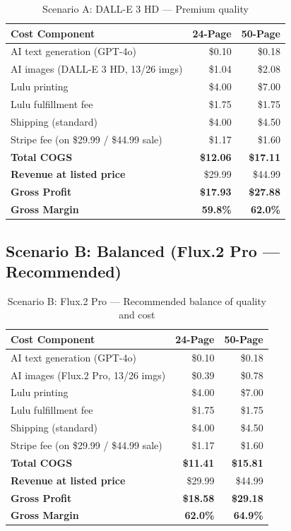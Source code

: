 \documentclass[12pt, letterpaper, oneside]{book}
\begin{document}
\begin{table}[H]
\centering
\begin{tabular}{lrr}
\toprule
\textbf{Cost Component} & \textbf{24-Page} & \textbf{50-Page} \\
\midrule
AI text generation (GPT-4o) & \$0.10 & \$0.18 \\
AI images (DALL-E 3 HD, 13/26 imgs) & \$1.04 & \$2.08 \\
Lulu printing & \$4.00 & \$7.00 \\
Lulu fulfillment fee & \$1.75 & \$1.75 \\
Shipping (standard) & \$4.00 & \$4.50 \\
Stripe fee (on \$29.99 / \$44.99 sale) & \$1.17 & \$1.60 \\
\midrule
\textbf{Total COGS} & \textbf{\$12.06} & \textbf{\$17.11} \\
\textbf{Revenue at listed price} & \$29.99 & \$44.99 \\
\textbf{Gross Profit} & \textcolor{success}{\textbf{\$17.93}} & \textcolor{success}{\textbf{\$27.88}} \\
\textbf{Gross Margin} & \textcolor{success}{\textbf{59.8\%}} & \textcolor{success}{\textbf{62.0\%}} \\
\bottomrule
\end{tabular}
\caption{Scenario A: DALL-E 3 HD --- Premium quality}
\end{table}

\subsection{Scenario B: Balanced (Flux.2 Pro --- Recommended)}

\begin{table}[H]
\centering
\begin{tabular}{lrr}
\toprule
\textbf{Cost Component} & \textbf{24-Page} & \textbf{50-Page} \\
\midrule
AI text generation (GPT-4o) & \$0.10 & \$0.18 \\
AI images (Flux.2 Pro, 13/26 imgs) & \$0.39 & \$0.78 \\
Lulu printing & \$4.00 & \$7.00 \\
Lulu fulfillment fee & \$1.75 & \$1.75 \\
Shipping (standard) & \$4.00 & \$4.50 \\
Stripe fee (on \$29.99 / \$44.99 sale) & \$1.17 & \$1.60 \\
\midrule
\textbf{Total COGS} & \textbf{\$11.41} & \textbf{\$15.81} \\
\textbf{Revenue at listed price} & \$29.99 & \$44.99 \\
\textbf{Gross Profit} & \textcolor{success}{\textbf{\$18.58}} & \textcolor{success}{\textbf{\$29.18}} \\
\textbf{Gross Margin} & \textcolor{success}{\textbf{62.0\%}} & \textcolor{success}{\textbf{64.9\%}} \\
\bottomrule
\end{tabular}
\caption{Scenario B: Flux.2 Pro --- Recommended balance of quality and cost}
\end{table}
\end{document}
